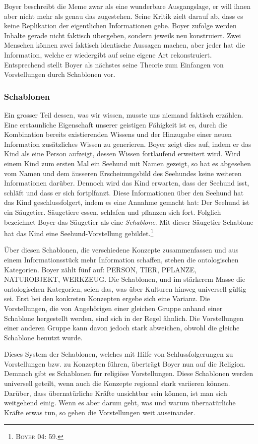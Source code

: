 Boyer beschreibt die Meme zwar als eine wunderbare Ausgangslage, er will ihnen aber nicht mehr als genau das zugestehen. Seine Kritik zielt darauf ab, dass es keine Replikation der eigentlichen Informationen gebe. Boyer zufolge werden Inhalte gerade nicht faktisch übergeben, sondern jeweils neu konstruiert. Zwei Menschen können zwei faktisch identische Aussagen machen, aber jeder hat die Information, welche er wiedergibt auf seine eigene Art rekonstruiert. Entsprechend stellt Boyer als nächstes seine Theorie zum Einfangen von Vorstellungen durch Schablonen vor.

\subsubsection{Schablonen}
Ein grosser Teil dessen, was wir wissen, musste uns niemand faktisch erzählen. Eine erstaunliche Eigenschaft unserer geistigen Fähigkeit ist es, durch die Kombination bereits existierenden Wissens und der Hinzugabe einer neuen Information zusätzliches Wissen zu generieren. Boyer zeigt dies auf, indem er das Kind als eine Person aufzeigt, dessen Wissen fortlaufend erweitert wird. Wird einem Kind zum ersten Mal ein Seehund mit Namen gezeigt, so hat es abgesehen vom Namen und dem äusseren Erscheinungsbild des Seehundes keine weiteren Informationen darüber. Dennoch wird das Kind erwarten, dass der Seehund isst, schläft und dass er sich fortplfanzt. Diese Informationen über den Seehund hat das Kind geschlussfolgert, indem es eine Annahme gemacht hat: Der Seehund ist ein Säugetier. Säugetiere essen, schlafen und pflanzen sich fort. Folglich be\-zeichnet Boyer das Säugetier als eine \emph{Schablone}. Mit dieser Säugetier-Schablone hat das Kind eine Seehund-Vorstellung gebildet.\footnote{\textsc{Boyer 04: 59.}} 

Über diesen Schablonen, die verschiedene Konzepte zusammenfassen und aus einem Informationsstück mehr Information schaffen, stehen die ontolo\-gischen Kategorien. Boyer zählt fünf auf: PERSON, TIER, PFLANZE, NA\-TUR\-OB\-JEKT, WERKZEUG. Die Schablonen, und im stärkerem Masse die ontolo\-gischen Kategorien, seien das, was über Kulturen hinweg universell gültig sei. Erst bei den konkreten Konzepten ergebe sich eine Varianz. Die Vorstellungen, die von Angehörigen einer gleichen Gruppe anhand einer Schablone hergestellt werden, sind sich in der Regel ähnlich. Die Vorstellungen einer anderen Gruppe kann davon jedoch stark abweichen, obwohl die gleiche Schablone benutzt wurde. 

Dieses System der Schablonen, welches mit Hilfe von Schlussfolgerungen zu Vorstellungen bzw. zu Konzepten führen, überträgt Boyer nun auf die Religion. Demnach gibt es Schablonen für religiöse Vorstellungen. Diese Schablonen werden universell geteilt, wenn auch die Konzepte regional stark variieren können. Darüber, dass übernatürliche Kräfte unsichtbar sein können, ist man sich weitgehend einig. Wenn es aber darum geht, was und warum übernatürliche Kräfte etwas tun, so gehen die Vorstellungen weit auseinander. 

